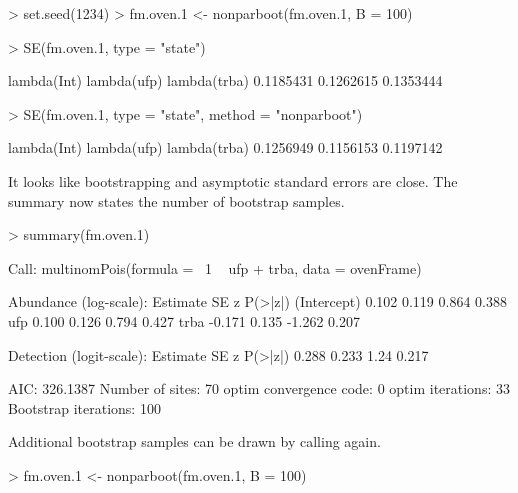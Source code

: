 \documentclass[article,shortnames]{jss}
\begin{document}
\begin{Schunk}
\begin{Sinput}
> set.seed(1234)
> fm.oven.1 <- nonparboot(fm.oven.1, B = 100)
\end{Sinput}
\end{Schunk}

\begin{Schunk}
\begin{Sinput}
> SE(fm.oven.1, type = "state")
\end{Sinput}
\begin{Soutput}
 lambda(Int)  lambda(ufp) lambda(trba) 
   0.1185431    0.1262615    0.1353444 
\end{Soutput}
\begin{Sinput}
> SE(fm.oven.1, type = "state", method = "nonparboot")
\end{Sinput}
\begin{Soutput}
 lambda(Int)  lambda(ufp) lambda(trba) 
   0.1256949    0.1156153    0.1197142 
\end{Soutput}
\end{Schunk}

It looks like bootstrapping and asymptotic standard errors are close.
The summary now states the number of bootstrap samples.

\begin{Schunk}
\begin{Sinput}
> summary(fm.oven.1)
\end{Sinput}
\begin{Soutput}
Call:
multinomPois(formula = ~1 ~ ufp + trba, data = ovenFrame)

Abundance (log-scale):
            Estimate    SE      z P(>|z|)
(Intercept)    0.102 0.119  0.864   0.388
ufp            0.100 0.126  0.794   0.427
trba          -0.171 0.135 -1.262   0.207

Detection (logit-scale):
 Estimate    SE    z P(>|z|)
    0.288 0.233 1.24   0.217

AIC: 326.1387 
Number of sites: 70
optim convergence code: 0
optim iterations: 33 
Bootstrap iterations: 100 
\end{Soutput}
\end{Schunk}

Additional bootstrap samples can be drawn by calling  again.
\begin{Schunk}
\begin{Sinput}
> fm.oven.1 <- nonparboot(fm.oven.1, B = 100)
\end{Sinput}
\end{Schunk}
\end{document}
